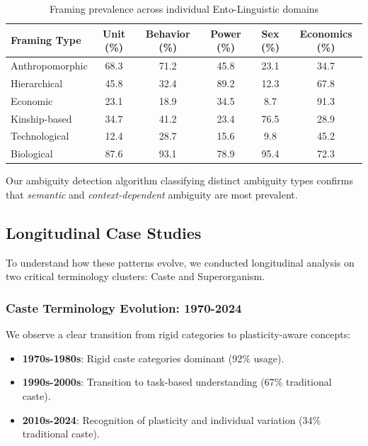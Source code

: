 \documentclass[
]{article}
\providecommand{\tightlist}{%
  \setlength{\itemsep}{0pt}\setlength{\parskip}{0pt}}
\numberwithin{equation}{section}
\begin{document}
\begin{table}[h]
\centering
\begin{tabular}{|l|c|c|c|c|c|}
\hline
\textbf{Framing Type} & \textbf{Unit (\%)} & \textbf{Behavior (\%)} & \textbf{Power (\%)} & \textbf{Sex (\%)} & \textbf{Economics (\%)} \\
\hline
Anthropomorphic & 68.3 & 71.2 & 45.8 & 23.1 & 34.7 \\
Hierarchical & 45.8 & 32.4 & 89.2 & 12.3 & 67.8 \\
Economic & 23.1 & 18.9 & 34.5 & 8.7 & 91.3 \\
Kinship-based & 34.7 & 41.2 & 23.4 & 76.5 & 28.9 \\
Technological & 12.4 & 28.7 & 15.6 & 9.8 & 45.2 \\
Biological & 87.6 & 93.1 & 78.9 & 95.4 & 72.3 \\
\hline
\end{tabular}
\caption{Framing prevalence across individual Ento-Linguistic domains}
\label{tab:domain_framing_prevalence}
\end{table}

Our ambiguity detection algorithm classifying distinct ambiguity types
confirms that \emph{semantic} and \emph{context-dependent} ambiguity are
most prevalent.

\subsection{Longitudinal Case Studies}\label{longitudinal-case-studies}

To understand how these patterns evolve, we conducted longitudinal
analysis on two critical terminology clusters: Caste and Superorganism.

\subsubsection{Caste Terminology Evolution:
1970-2024}\label{caste-terminology-evolution-1970-2024}

We observe a clear transition from rigid categories to plasticity-aware
concepts:

\begin{itemize}
\tightlist
\item
  \textbf{1970s-1980s}: Rigid caste categories dominant (92\% usage).
\item
  \textbf{1990s-2000s}: Transition to task-based understanding (67\%
  traditional caste).
\item
  \textbf{2010s-2024}: Recognition of plasticity and individual
  variation (34\% traditional caste).
\end{itemize}
\end{document}
